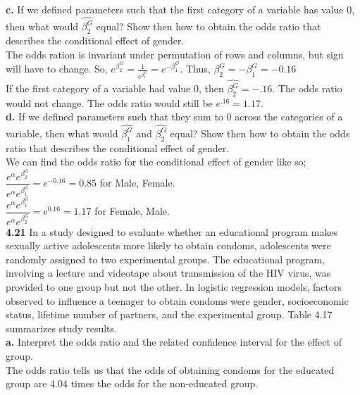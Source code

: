 \documentclass[paper=letter, fontsize=11pt]{scrartcl} %
\begin{document}
\textbf{c.} If we defined parameters such that the first category of a variable has value
0, then what would $\hat{\beta_2^G}$ equal? Show then how to obtain the odds ratio that
describes the conditional effect of gender. \\
The odds ration is invariant under permutation of rows and columns, but sign will have 
to change. So, $e^{\beta_2^G} = \frac{1}{e^{\beta_1^G}} = e^{-\beta_1^G}$. Thus, 
$\beta_2^G = -\beta_1^G = -0.16$ \\
If the first category of a variable had value 0, then $\hat{\beta_2^G} = -.16$. The odds
ratio would not change. The odds ratio would still be $e^{.16} = 1.17$.
\\

\textbf{d.} If we defined parameters such that they sum to 0 across the categories of a
variable, then what would $\hat{\beta_1^G}$ and $\hat{\beta_2^G}$ equal? Show then how
to obtain the odds ratio that describes the conditional effect of gender.
\\
We can find the odds ratio for the conditional effect of gender like so; \\
$\dfrac{e^{\alpha}e^{\beta_2^G}}{e^{\alpha}e^{\beta_1^G}} = e^{-0.16} = 0.85$
for Male, Female. \\
$\dfrac{e^{\alpha}e^{\beta_1^G}}{e^{\alpha}e^{\beta_2^G}} = e^{0.16} = 1.17$
for Female, Male.
\\

\textbf{4.21} In a study designed to evaluate whether an educational program makes
sexually active adolescents more likely to obtain condoms, adolescents were randomly
assigned to two experimental groups. The educational program, involving a
lecture and videotape about transmission of the HIV virus, was provided to one
group but not the other. In logistic regression models, factors observed to influence
a teenager to obtain condoms were gender, socioeconomic status, lifetime
number of partners, and the experimental group. Table 4.17 summarizes study
results. \\

\textbf{a.} Interpret the odds ratio and the related confidence interval for the effect
of group. \\
The odds ratio tells us that the odds of obtaining condoms for the educated group 
are 4.04 times the odds for the non-educated group.
\\
\end{document}
